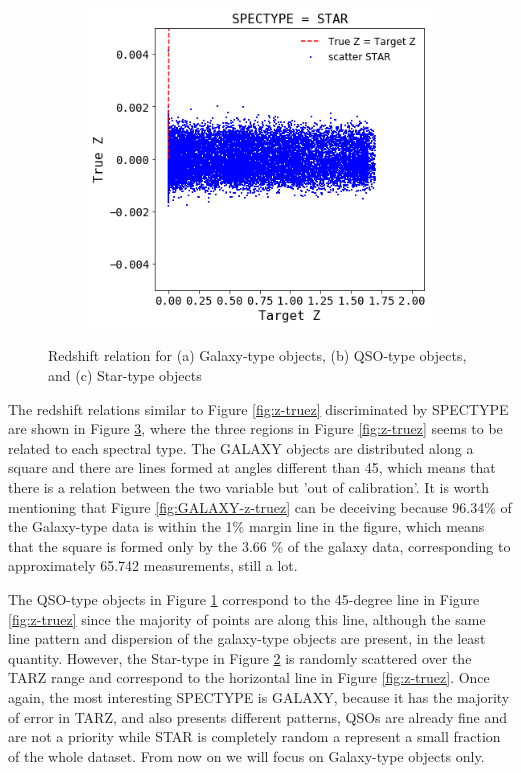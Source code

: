 \begin{figure}
\begin{subfigure}[b]{0.5\textwidth}
		\caption{}
		\label{fig:QSO-z-truez}
	\end{subfigure}
	\begin{subfigure}[b]{0.5\textwidth}
		\includegraphics[width=1\linewidth]{TeX_files/Imagenes/STAR-z-truez}
		\caption{}
		\label{fig:STAR-z-truez}
	\end{subfigure}
	\caption{ Redshift relation for (a) Galaxy-type objects, (b) QSO-type objects, and (c) Star-type objects }
	\label{fig:SPECTYPE-z-truez}
\end{figure}

The redshift relations similar to Figure \ref{fig:z-truez} discriminated by SPECTYPE are shown in Figure \ref{fig:SPECTYPE-z-truez}, where the three regions in Figure \ref{fig:z-truez} seems to be related to each spectral type. The GALAXY objects are distributed along a square and there are lines formed at angles different than 45, which means that there is a relation between the two variable but 'out of calibration'. It is worth mentioning that Figure \ref{fig:GALAXY-z-truez}  can be deceiving because 96.34\% of the Galaxy-type data is within the 1\% margin line in the figure, which means that the square is formed only by the 3.66 \% of the galaxy data, corresponding to approximately  65.742 measurements, still a lot. 

The QSO-type objects in Figure \ref{fig:QSO-z-truez} correspond to the 45-degree line in Figure \ref{fig:z-truez} since the majority of points are along this line, although the same line pattern and dispersion of the galaxy-type objects are present, in the least quantity. However, the Star-type in Figure \ref{fig:STAR-z-truez} is randomly scattered over the TARZ range and correspond to the horizontal line in Figure \ref{fig:z-truez}. Once again, the most interesting SPECTYPE is GALAXY, because it has the majority of error in TARZ, and also presents different patterns, QSOs are already fine and are not a priority while STAR is completely random a represent a small fraction of the whole dataset. From now on we will focus on Galaxy-type objects only.  

